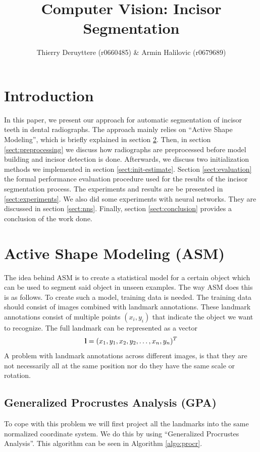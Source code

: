 \documentclass[a4paper]{article}
\title{Computer Vision: Incisor Segmentation}
\author{Thierry Deruyttere (r0660485) \& Armin Halilovic (r0679689)}
\begin{document}
\maketitle

\section{Introduction}
In this paper, we present our approach for automatic segmentation of incisor teeth in dental radiographs.
The approach mainly relies on ``Active Shape Modeling'', which is briefly explained in section \ref{sect:asm}.
Then, in section \ref{sect:preprocessing} we discuss how radiographs are preprocessed before model building and incisor detection is done.
Afterwards, we discuss two initialization methods we implemented in section \ref{sect:init-estimate}.
Section \ref{sect:evaluation} the formal performance evaluation procedure used for the results of the incisor segmentation process.
The experiments and results are be presented in \ref{sect:experiments}.
We also did some experiments with neural networks. They are discussed in section \ref{sect:nns}.
Finally, section \ref{sect:conclusion} provides a conclusion of the work done.

\section{Active Shape Modeling (ASM)}
\label{sect:asm}
The idea behind ASM is to create a statistical model for a certain object which can be used to segment said object in unseen examples. 
The way ASM does this is as follows.
To create such a model, training data is needed. 
The training data should consist of images combined with landmark annotations.
These landmark annotations consist of multiple points $({x_i, y_i})$ that indicate the object we want to recognize.
The full landmark can be represented as a vector 
\begin{equation}
\textnormal{\textbf{l}} = (x_1, y_1, x_2, y_2, \ldots, x_n, y_n)^T
\end{equation}
A problem with landmark annotations across different images, is that they are not necessarily all at the same position nor do they have the same scale or rotation.
\subsection{Generalized Procrustes Analysis (GPA)}
\bigskip
To cope with this problem we will first project all the landmarks into the same normalized coordinate system. 
We do this by using ``Generalized Procrustes Analysis''.
This algorithm can be seen in Algorithm \ref{algo:procr}.
\bigskip
\end{document}

